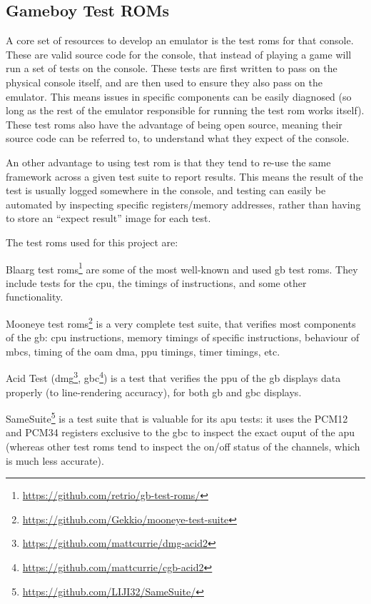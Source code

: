 \documentclass[11pt]{report}
\newcommand{\ftnt}[1]{\footnote{\url{#1}}}
\begin{document}
\subsection{Gameboy Test ROMs}
\label{sec:gb-test-roms}

A core set of resources to develop an emulator is the test \glspl{rom} for that console. These are valid source code for the console, that instead of playing a game will run a set of tests on the console. These tests are first written to pass on the physical console itself, and are then used to ensure they also pass on the emulator. This means issues in specific components can be easily diagnosed (so long as the rest of the emulator responsible for running the test \gls{rom} works itself). These test \glspl{rom} also have the advantage of being open source, meaning their source code can be referred to, to understand what they expect of the console.

An other advantage to using test \gls{rom} is that they tend to re-use the same framework across a given test suite to report results. This means the result of the test is usually logged somewhere in the console, and testing can easily be automated by inspecting specific registers/memory addresses, rather than having to store an ``expect result'' image for each test.

The test \glspl{rom} used for this project are:

\begin{compactitem}
    \item Blaarg test \glspl{rom}\ftnt{https://github.com/retrio/gb-test-roms/} are some of the most well-known and used \gls{gb} test \glspl{rom}. They include tests for the \gls{cpu}, the timings of instructions, and some other functionality.
    \item Mooneye test \glspl{rom}\ftnt{https://github.com/Gekkio/mooneye-test-suite} is a very complete test suite, that verifies most components of the \gls{gb}: \gls{cpu} instructions, memory timings of specific instructions, behaviour of \glspl{mbc}, timing of the \gls{oam} \gls{dma}, \gls{ppu} timings, timer timings, etc.
    \item Acid Test (\gls{dmg}\ftnt{https://github.com/mattcurrie/dmg-acid2}, \gls{gbc}\ftnt{https://github.com/mattcurrie/cgb-acid2}) is a test that verifies the \gls{ppu} of the \gls{gb} displays data properly (to line-rendering accuracy), for both \glsdesc{gb} and \glsdesc{gbc} displays.
    \item SameSuite\ftnt{https://github.com/LIJI32/SameSuite/} is a test suite that is valuable for its \gls{apu} tests: it uses the PCM12 and PCM34 registers exclusive to the \gls{gbc} to inspect the exact ouput of the \gls{apu} (whereas other test \glspl{rom} tend to inspect the on/off status of the channels, which is much less accurate).
\end{compactitem}
\end{document}
